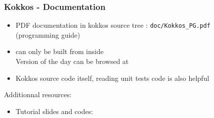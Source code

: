 \begin{frame}
  \frametitle{Kokkos - Documentation}

  \begin{itemize}
  \item PDF documentation in kokkos source tree : \texttt{doc/Kokkos\_PG.pdf} (programming guide)
  \item {} can only be built from inside \\
    Version of the day can be browsed at 
  \item Kokkos source code itself, reading unit tests code is also helpful
  \end{itemize}

  Additionnal resources:

  \begin{itemize}
  \item Tutorial slides and codes: \\
  \end{itemize}
  
\end{frame}

